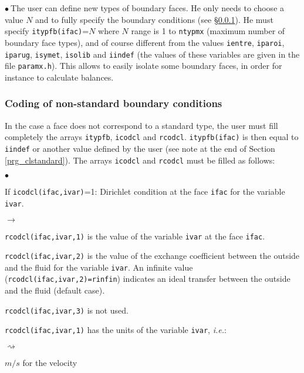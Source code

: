 {{{\noindent
$\bullet\ $The user can define new types of boundary faces. He only needs to
choose a value $N$ and to fully specify the boundary conditions (see
\S\ref{prg_clnonstandard}). He must specify
\texttt{itypfb(ifac)}=$N$ where $N$ range is 1 to
\texttt{ntypmx} (maximum number of boundary face types), and of
course different from the values \texttt{ientre}, \texttt{iparoi},
\texttt{iparug}, \texttt{isymet}, \texttt{isolib} and \texttt{iindef} (the values
of these variables are given in the file \texttt{paramx.h}). This allows to
easily isolate some boundary faces, in order for instance to calculate balances.

%

\subsubsection{Coding of non-standard boundary conditions}
\label{prg_clnonstandard}%
In the case a face does not correspond to a standard type, the user
must fill completely the arrays \texttt{itypfb}, \texttt{icodcl} and
\texttt{rcodcl}. \texttt{itypfb(ifac)} is then equal to \texttt{iindef}
or another value defined by the user (see note at the end of Section
\ref{prg_clstandard}). The arrays \texttt{icodcl} and \texttt{rcodcl}
must be filled as follows:

\begin{list}{$\bullet$}{}
\item If \texttt{icodcl(ifac,ivar)}=1: Dirichlet condition at the face
      \texttt{ifac} for the variable \texttt{ivar}.

\begin{list}{$\rightarrow$}{}
\item \texttt{rcodcl(ifac,ivar,1)} is the value of the variable \texttt{ivar}
      at the face \texttt{ifac}.

\item \texttt{rcodcl(ifac,ivar,2)} is the value of the exchange coefficient
      between the outside and the fluid for the variable \texttt{ivar}. An
      infinite value (\texttt{rcodcl(ifac,ivar,2)=rinfin}) indicates an
      ideal transfer between the outside and the fluid (default case).

\item \texttt{rcodcl(ifac,ivar,3)} is not used.

\item \texttt{rcodcl(ifac,ivar,1)} has the units of the variable
      \texttt{ivar}, {\em i.e.}:
\begin{list}{$\rightsquigarrow$}{}
\item $m/s$ for the velocity


\end{list}
\end{list}
\end{list}}}}
